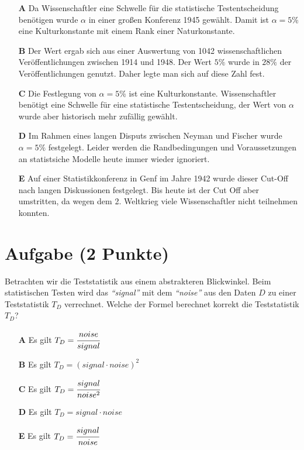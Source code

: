 \documentclass[a4paper, 9pt]{scrartcl}\usepackage[]{graphicx}\usepackage[]{xcolor}
\begin{document}
\begin{enumerate}
\item [\textbf{A} \msquare] Da Wissenschaftler eine Schwelle für die statistische Testentscheidung benötigen wurde $\alpha$ in einer großen Konferenz 1945 gewählt. Damit ist $\alpha = 5\%$ eine Kulturkonstante mit einem Rank einer Naturkonstante.
\item [\textbf{B} \msquare] Der Wert ergab sich aus einer Auswertung von 1042 wissenschaftlichen Veröffentlichungen zwischen 1914 und 1948. Der Wert $5\%$ wurde in $28\%$ der Veröffentlichungen genutzt. Daher legte man sich auf diese Zahl fest.
\item [\textbf{C} \msquare] Die Festlegung von $\alpha = 5\%$ ist eine Kulturkonstante. Wissenschaftler benötigt eine Schwelle für eine statistische Testentscheidung, der Wert von $\alpha$ wurde aber historisch mehr zufällig gewählt.
\item [\textbf{D} \msquare] Im Rahmen eines langen Disputs zwischen Neyman und Fischer wurde $\alpha = 5\%$ festgelegt. Leider werden die Randbedingungen und Voraussetzungen an statistsiche Modelle heute immer wieder ignoriert.
\item [\textbf{E} \msquare] Auf einer Statistikkonferenz in Genf im Jahre 1942 wurde dieser Cut-Off nach langen Diskussionen festgelegt. Bis heute ist der Cut Off aber umstritten, da wegen dem 2. Weltkrieg viele Wissenschaftler nicht teilnehmen konnten.
\end{enumerate}

\section{Aufgabe \hfill (2 Punkte)}

Betrachten wir die Teststatistik aus einem abstrakteren Blickwinkel. Beim
statistischen Testen wird das \textit{"`signal"'} mit dem
\textit{"`noise"'} aus den Daten $D$ zu einer Teststatistik $T_D$ verrechnet. Welche der Formel
berechnet korrekt die Teststatistik $T_D$?



\begin{enumerate}
\item [\textbf{A} \msquare] Es gilt $T_D = \cfrac{noise}{signal}$
\item [\textbf{B} \msquare] Es gilt $T_D = (signal \cdot noise)^2$
\item [\textbf{C} \msquare] Es gilt $T_D = \cfrac{signal}{noise^2}$
\item [\textbf{D} \msquare] Es gilt $T_D = signal \cdot noise$
\item [\textbf{E} \msquare] Es gilt $T_D = \cfrac{signal}{noise}$
\end{enumerate}
\end{document}
